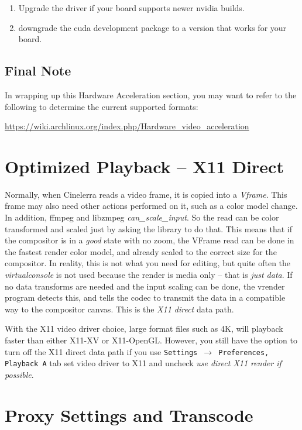 \begin{enumerate}
	\item Upgrade the driver if your board supports newer nvidia builds.
	\item downgrade the cuda development package to a version that works for your board.
\end{enumerate}

\subsection{Final Note}%
\label{sub:final_note_on_acceleration}

In wrapping up this Hardware Acceleration section, you may want to refer to the following to determine the current supported formats:

{\small \url{https://wiki.archlinux.org/index.php/Hardware_video_acceleration}}

\section{Optimized Playback -- X11 Direct}%
\label{sec:optimized_playback}

Normally, when Cinelerra reads a video frame, it is copied into a \textit{Vframe}.  This frame may also need other actions performed on it, such as a color model change.  In addition, ffmpeg and libzmpeg \textit{can\_scale\_input}.  So the read can be color transformed and scaled just by asking the library to do that.  This means that if the compositor is in a \textit{good} state with no zoom, the VFrame read can be done in the fastest render color model, and already scaled to the correct size for the compositor.  In reality, this is not what you need for editing, but quite often the \textit{virtualconsole} is not used because the render is media only -- that is \textit{just data}.  If no data transforms are needed and the input scaling can be done, the vrender program detects this, and tells the codec to transmit the data in a compatible way to the compositor canvas. This is the \textit{X11 direct} data path.

With the X11 video driver choice, large format files such as 4K, will playback faster than either X11-XV or X11-OpenGL.  However, you still have the option to turn off the X11 direct data path if you use
\texttt{Settings $\rightarrow$ Preferences, Playback A} tab set video driver to X11 and uncheck \textit{use direct X11 render if possible}.


\section{Proxy Settings and Transcode}%
\label{sec:proxy_settings}

